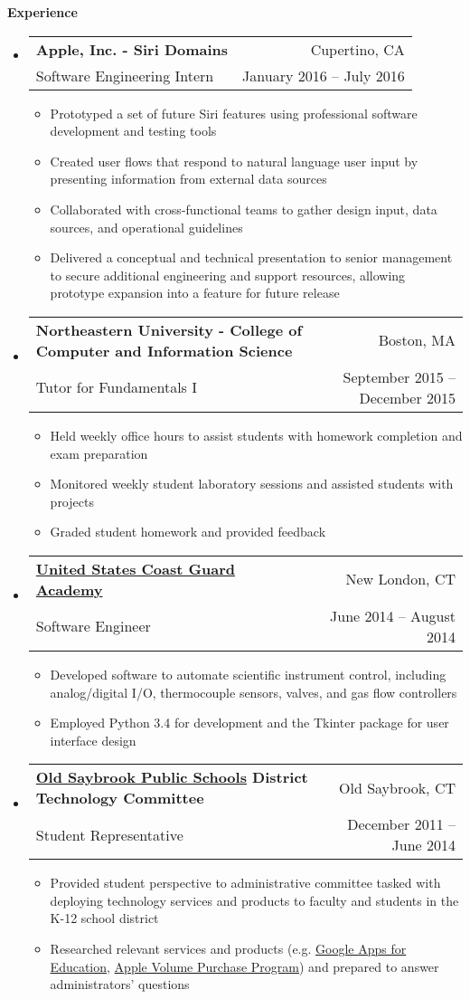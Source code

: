 \documentclass[letterpaper,10.6pt]{article}
\makeatletter
\newcommand{\resitem}[1]{\item #1 \vspace{-2pt}}
\newcommand{\resheading}[1]{{\large \colorbox{mygrey}{\begin{minipage}{\textwidth}{\textbf{#1 \vphantom{p\^{E}}}}\end{minipage}}}}
\newcommand{\ressubheading}[4]{
\begin{tabular*}{6.8in}{l@{\extracolsep{\fill}}r}
		\textbf{#1} & #2 \\
		\small{#3} & \small{#4} \\
\end{tabular*}\vspace{-6pt}}
\makeatother
\begin{document}
\resheading{Experience}
	\begin{itemize}[leftmargin=*]
		\item[]
			\ressubheading{Apple, Inc. - \small{Siri Domains}}{Cupertino, CA}{Software Engineering Intern}{January 2016 -- July 2016}
			{\footnotesize
				\begin{itemize}
					\resitem{Prototyped a set of future Siri features using professional software development and testing tools}
					\resitem{Created user flows
						that respond to natural language user input by presenting information from external data sources}
					\resitem{Collaborated with cross-functional teams to gather design input, data sources, and operational guidelines}
					\resitem{Delivered a conceptual and technical presentation to senior management to secure additional engineering and support resources, allowing prototype expansion into a feature for future release}
				\end{itemize}}
		\item[]
			\ressubheading{Northeastern University - \small{College of Computer and Information Science}}{Boston, MA}{Tutor for Fundamentals I}{September 2015 -- December 2015}
			{\footnotesize
				\begin{itemize}
					\resitem{Held weekly office hours to assist students with homework completion and exam preparation}
					\resitem{Monitored weekly student laboratory sessions and assisted students with projects}
					\resitem{Graded student homework and provided feedback}
				\end{itemize}}
		\item[] 
			\ressubheading{\href{http://www.uscga.edu}{United States Coast Guard Academy}}{New London, CT}
				{Software Engineer}{June 2014 -- August 2014}
				{ \footnotesize
				\begin{itemize}
					\resitem{Developed software to automate scientific instrument control, including analog/digital I/O, thermocouple sensors, valves, and gas flow controllers}
					\resitem{Employed Python 3.4 for development and the Tkinter package for user interface design}
				\end{itemize}
				}
		\item[]
			\ressubheading{\href{http://www.oldsaybrookschools.org}{Old Saybrook Public Schools} District Technology Committee}{Old Saybrook, CT}
				{Student Representative}{December 2011 --  June 2014}
				{\footnotesize
				\begin{itemize}
					\resitem{Provided student perspective to administrative committee tasked with deploying technology services and products to faculty and students in the K-12 school district}
					\resitem{Researched relevant services and products (e.g. \href{https://www.google.com/work/apps/education/}{Google Apps for Education}, \href{http://www.apple.com/education/it/vpp/}{Apple Volume Purchase Program}) and prepared to answer administrators' questions}
				\end{itemize}}
	\end{itemize} 
\end{document}
